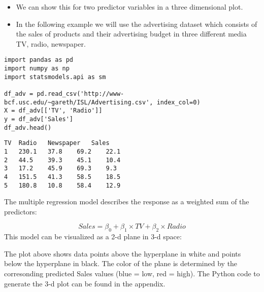\begin{frame}[fragile]
	\Large
\begin{itemize}
\item We can show this for two predictor variables in a three dimensional plot. 
\item In the following example we will use the advertising dataset which consists of the sales of products and their advertising budget in three different media TV, radio, newspaper.
\end{itemize}

\end{frame}

\begin{frame}[fragile]
	\Large
\begin{framed}
\begin{verbatim}
import pandas as pd
import numpy as np
import statsmodels.api as sm

df_adv = pd.read_csv('http://www-bcf.usc.edu/~gareth/ISL/Advertising.csv', index_col=0)
X = df_adv[['TV', 'Radio']]
y = df_adv['Sales']
df_adv.head()
\end{verbatim}
\end{framed}
\end{frame}

\begin{frame}[fragile]
	\Large
\begin{framed}
	\begin{verbatim}
TV	Radio	Newspaper	Sales
1	230.1	37.8	69.2	22.1
2	44.5	39.3	45.1	10.4
3	17.2	45.9	69.3	9.3
4	151.5	41.3	58.5	18.5
5	180.8	10.8	58.4	12.9
\end{verbatim}
\end{framed}
The multiple regression model describes the response as a weighted sum of the predictors:

\[Sales=\beta_0+\beta_1\times TV+\beta_2\times Radio\]
This model can be visualized as a 2-d plane in 3-d space:
\end{frame}

\begin{frame}[fragile]
	\Large

The plot above shows data points above the hyperplane in white and points below the hyperplane in black. The color of the plane is determined by the corresonding predicted Sales values (blue = low, red = high). The Python code to generate the 3-d plot can be found in the appendix.
\end{frame}

